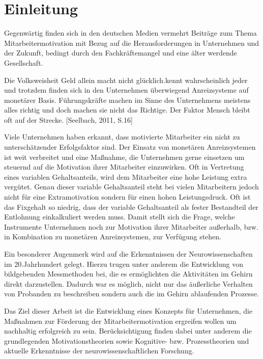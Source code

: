 \section{Einleitung} %
\label{sub:motivation}

Gegenwärtig finden sich in den deutschen Medien vermehrt Beiträge zum Thema Mitarbeitermotivation mit Bezug auf die Herausforderungen in Unternehmen und der Zukunft, bedingt durch den Fachkräftemangel und eine älter werdende Gesellschaft. 

Die Volksweisheit \glqq Geld allein macht nicht glücklich.\grqq kennt wahrscheinlich jeder und trotzdem finden sich in den Unternehmen überwiegend Anreizsysteme auf monetärer Basis. Führungskräfte machen im Sinne des Unternehmens meistens alles richtig und doch machen sie nicht das Richtige. Der Faktor Mensch bleibt oft auf der Strecke. [Seelbach, 2011, S.16]

Viele Unternehmen haben erkannt, dass motivierte Mitarbeiter ein nicht zu unterschätzender Erfolgsfaktor sind. Der Einsatz von monetären Anreizsystemen ist weit verbreitet und eine Maßnahme, die Unternehmen gerne einsetzen um steuernd auf die Motivation ihrer Mitarbeiter einzuwirken. Oft in Vertretung eines variablen Gehaltsanteils, wird dem Mitarbeiter eine hohe Leistung extra vergütet. Genau dieser variable Gehaltsanteil steht bei vielen Mitarbeitern jedoch nicht für  eine Extramotivation sondern für einen hohen Leistungsdruck. Oft ist das Fixgehalt so niedrig, dass der variable Gehaltsanteil als fester Bestandteil der Entlohnung einkalkuliert werden muss. Damit stellt sich die Frage, welche Instrumente Unternehmen noch zur Motivation ihrer Mitarbeiter außerhalb, bzw. in Kombination zu monetären Anreizsystemen, zur Verfügung stehen.

Ein besonderer Augenmerk wird auf die Erkenntnissen der Neurowissenschaften im  20.Jahrhundert gelegt. Hierzu trugen unter anderem die Entwicklung von bildgebenden Messmethoden bei, die es ermöglichten die Aktivitäten im Gehirn direkt darzustellen. Dadurch war es möglich, nicht nur das äußerliche Verhalten von Probanden zu beschreiben sondern auch die im Gehirn ablaufenden Prozesse. 

Das Ziel dieser Arbeit ist die Entwicklung eines Konzepts für Unternehmen, die Maßnahmen zur Förderung der Mitarbeitermotivation ergreifen wollen um nachhaltig erfolgreich zu sein. Berücksichtigung finden dabei unter anderem die grundlegenden Motivationstheorien sowie Kognitive- bzw. Prozesstheorien und aktuelle Erkenntnisse der neurowissenschaftlichen Forschung.

\newpage